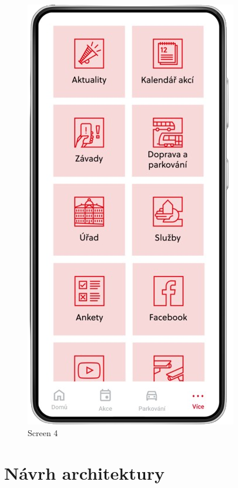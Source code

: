 \begin{figure}[H]
    \includegraphics[width=\linewidth]{screen4.png}
    \caption{Screen 4}\label{fig:screen4}
  \endminipage\hfill
\end{figure}

\section{Návrh architektury}


